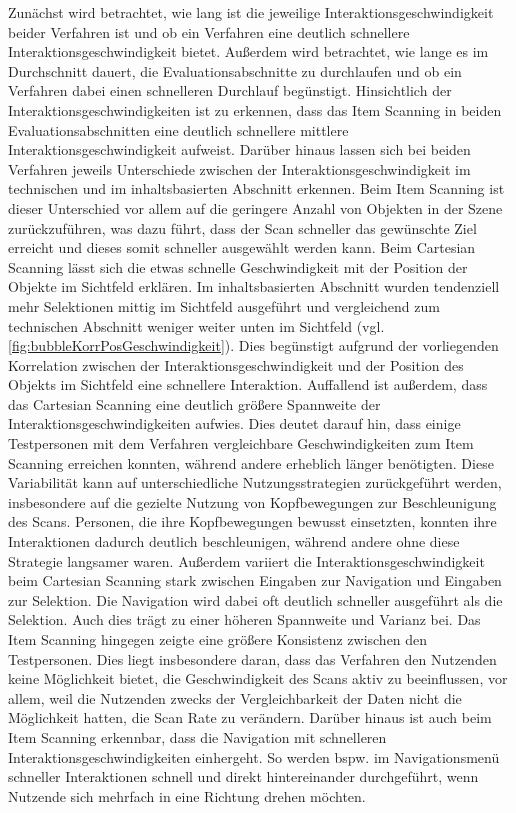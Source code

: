 Zunächst wird betrachtet, wie lang ist die jeweilige Interaktionsgeschwindigkeit beider Verfahren ist und ob ein Verfahren eine deutlich schnellere Interaktionsgeschwindigkeit bietet. Außerdem wird betrachtet, wie lange es im Durchschnitt dauert, die Evaluationsabschnitte zu durchlaufen und ob ein Verfahren dabei einen schnelleren Durchlauf begünstigt. 
Hinsichtlich der Interaktionsgeschwindigkeiten ist zu erkennen, dass das Item Scanning in beiden Evaluationsabschnitten eine deutlich schnellere mittlere Interaktionsgeschwindigkeit aufweist. Darüber hinaus lassen sich bei beiden Verfahren jeweils Unterschiede zwischen der Interaktionsgeschwindigkeit im technischen und im inhaltsbasierten Abschnitt erkennen. Beim Item Scanning ist dieser Unterschied vor allem auf die geringere Anzahl von Objekten in der Szene zurückzuführen, was dazu führt, dass der Scan schneller das gewünschte Ziel erreicht und dieses somit schneller ausgewählt werden kann. Beim Cartesian Scanning lässt sich die etwas schnelle Geschwindigkeit mit der Position der Objekte im Sichtfeld erklären. Im inhaltsbasierten Abschnitt wurden tendenziell mehr Selektionen mittig im Sichtfeld ausgeführt und vergleichend zum technischen Abschnitt weniger weiter unten im Sichtfeld (vgl. \autoref{fig:bubbleKorrPosGeschwindigkeit}).  Dies begünstigt aufgrund der vorliegenden Korrelation zwischen der Interaktionsgeschwindigkeit und der Position des Objekts im Sichtfeld eine schnellere Interaktion. 
Auffallend ist außerdem, dass das Cartesian Scanning eine deutlich größere Spannweite der Interaktionsgeschwindigkeiten aufwies. Dies deutet darauf hin, dass einige Testpersonen mit dem Verfahren vergleichbare Geschwindigkeiten zum Item Scanning erreichen konnten, während andere erheblich länger benötigten. Diese Variabilität kann auf unterschiedliche Nutzungsstrategien zurückgeführt werden, insbesondere auf die gezielte Nutzung von Kopfbewegungen zur Beschleunigung des Scans. Personen, die ihre Kopfbewegungen bewusst einsetzten, konnten ihre Interaktionen dadurch deutlich beschleunigen, während andere ohne diese Strategie langsamer waren. Außerdem variiert die Interaktionsgeschwindigkeit beim Cartesian Scanning stark zwischen Eingaben zur Navigation und Eingaben zur Selektion. Die Navigation wird dabei oft deutlich schneller ausgeführt als die Selektion. Auch dies trägt zu einer höheren Spannweite und Varianz bei. Das Item Scanning hingegen zeigte eine größere Konsistenz zwischen den Testpersonen. Dies liegt insbesondere daran, dass das Verfahren den Nutzenden keine Möglichkeit bietet, die Geschwindigkeit des Scans aktiv zu beeinflussen, vor allem, weil die Nutzenden zwecks der Vergleichbarkeit der Daten nicht die Möglichkeit hatten, die Scan Rate zu verändern. Darüber hinaus ist auch beim Item Scanning erkennbar, dass die Navigation mit schnelleren Interaktionsgeschwindigkeiten einhergeht. So werden bspw. im Navigationsmenü schneller Interaktionen schnell und direkt hintereinander durchgeführt, wenn Nutzende sich mehrfach in eine Richtung drehen möchten. 
